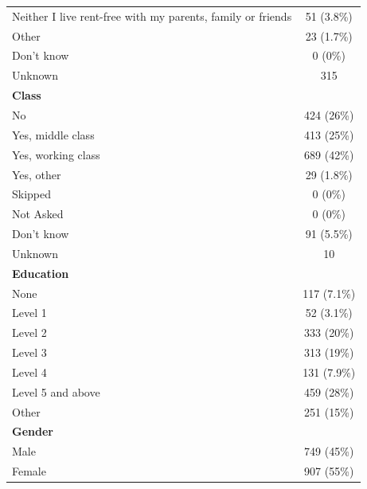\documentclass[]{cupjournal}
\begin{document}
\begin{longtable}[t]{lc}
\hspace{1em}Neither I live rent-free with my parents, family or friends & 51 (3.8\%)\\
\hspace{1em}Other & 23 (1.7\%)\\
\hspace{1em}Don't know & 0 (0\%)\\
\hspace{1em}Unknown & 315\\
\textbf{Class} & \\
\hspace{1em}No & 424 (26\%)\\
\hspace{1em}Yes, middle class & 413 (25\%)\\
\hspace{1em}Yes, working class & 689 (42\%)\\
\hspace{1em}Yes, other & 29 (1.8\%)\\
\hspace{1em}Skipped & 0 (0\%)\\
\hspace{1em}Not Asked & 0 (0\%)\\
\hspace{1em}Don't know & 91 (5.5\%)\\
\hspace{1em}Unknown & 10\\
\textbf{Education} & \\
\hspace{1em}None & 117 (7.1\%)\\
\hspace{1em}Level 1 & 52 (3.1\%)\\
\hspace{1em}Level 2 & 333 (20\%)\\
\hspace{1em}Level 3 & 313 (19\%)\\
\hspace{1em}Level 4 & 131 (7.9\%)\\
\hspace{1em}Level 5 and above & 459 (28\%)\\
\hspace{1em}Other & 251 (15\%)\\
\textbf{Gender} & \\
\hspace{1em}Male & 749 (45\%)\\
\hspace{1em}Female & 907 (55\%)\\

\end{longtable}
\end{document}
